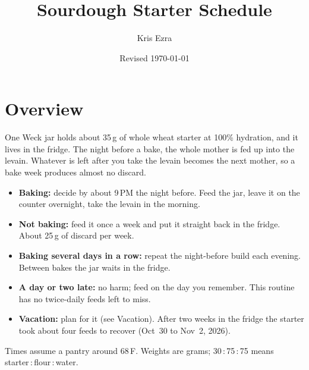 \documentclass[11pt]{article}
\title{Sourdough Starter Schedule}
\author{Kris Ezra}
\date{Revised \today}
\newcommand{\feed}[3]{#1\,:\,#2\,:\,#3}   %
\newcommand{\motherG}{35}
\newcommand{\buildTime}{9\,PM}
\begin{document}
\maketitle
\vspace{-1em}

\section*{Overview}

One Weck jar holds about \motherG\,g of whole wheat starter at 100\% hydration, and
it lives in the fridge. The night before a bake, the whole mother is fed up into the
levain. Whatever is left after you take the levain becomes the next mother, so a bake
week produces almost no discard.

\begin{itemize}
  \item \textbf{Baking:} decide by about \buildTime{} the night before. Feed the jar,
        leave it on the counter overnight, take the levain in the morning.
  \item \textbf{Not baking:} feed it once a week and put it straight back in the
        fridge. About 25\,g of discard per week.
  \item \textbf{Baking several days in a row:} repeat the night-before build each
        evening. Between bakes the jar waits in the fridge.
  \item \textbf{A day or two late:} no harm; feed on the day you remember. This routine
        has no twice-daily feeds left to miss.
  \item \textbf{Vacation:} plan for it (see Vacation). After two weeks in the fridge the
        starter took about four feeds to recover (Oct~30 to Nov~2, 2026).
\end{itemize}

Times assume a pantry around 68\,\textdegree F. Weights are grams; \feed{30}{75}{75}
means starter\,:\,flour\,:\,water.
\end{document}
